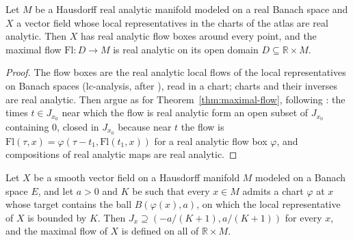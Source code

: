 \begin{theorem}
  \label{thm:maximal-flow-analytic}
  \leanok
  Let $M$ be a Hausdorff real analytic manifold modeled on a real Banach space and $X$ a vector
  field whose local representatives in the charts of the atlas are real analytic. Then $X$ has
  real analytic flow boxes around every point, and the maximal flow
  $\mathrm{Fl} \colon D \to M$ is real analytic on its open domain $D \subseteq \mathbb{R} \times M$.
\end{theorem}

\begin{proof}
  \leanok
  The flow boxes are the real analytic local flows of the local representatives on Banach spaces
  (lc-analysis, after \cite[Theorem~2.4.34]{GN26}), read in a chart; charts and their inverses are
  real analytic. Then argue as for Theorem~\ref{thm:maximal-flow}, following
  \cite[Theorem~2.5.18]{GN26}: the times $t \in J_{x_0}$ near which the flow is real analytic form
  an open subset of $J_{x_0}$ containing $0$, closed in $J_{x_0}$ because near $t$ the flow is
  $\mathrm{Fl}(\tau, x) = \varphi(\tau - t_1, \mathrm{Fl}(t_1, x))$ for a real analytic flow box
  $\varphi$, and compositions of real analytic maps are real analytic.
\end{proof}

\begin{theorem}
  \label{thm:flow-complete}
  \leanok
  Let $X$ be a smooth vector field on a Hausdorff manifold $M$ modeled on a Banach space $E$, and
  let $a > 0$ and $K$ be such that every $x \in M$ admits a chart $\varphi$ at $x$ whose target
  contains the ball $B(\varphi(x), a)$, on which the local representative of $X$ is bounded by
  $K$. Then $J_x \supseteq (-a/(K+1), a/(K+1))$ for every $x$, and the maximal flow of $X$ is
  defined on all of $\mathbb{R} \times M$.
\end{theorem}

